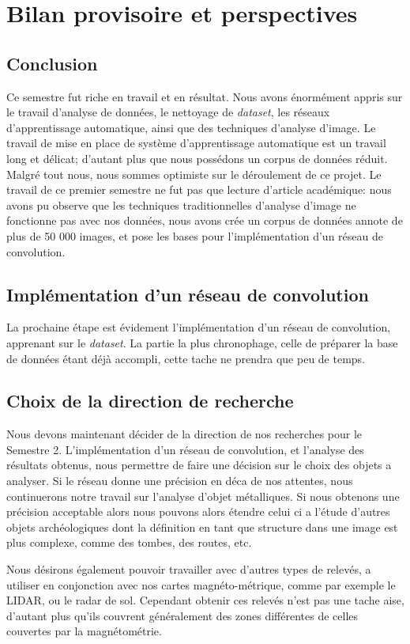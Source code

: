 \documentclass[a4paper, 12pt, titlepage, oneside, french]{article}
\begin{document}
\section{Bilan provisoire et perspectives}
	\subsection{Conclusion} %
	Ce semestre fut riche en travail et en résultat. Nous avons énormément appris sur le travail d'analyse de données, le nettoyage de \textit{dataset}, les réseaux d'apprentissage automatique, ainsi que des techniques d'analyse d'image. Le travail de mise en place de système d'apprentissage automatique est un travail long et délicat; d'autant plus que nous possédons un corpus de données réduit. Malgré tout nous, nous sommes optimiste sur le déroulement de ce projet. Le travail de ce premier semestre ne fut pas que lecture d'article académique: nous avons pu observe que les techniques traditionnelles d'analyse d'image ne fonctionne pas avec nos données, nous avons crée un corpus de données annote de plus de 50 000 images, et pose les bases pour l'implémentation d'un réseau de convolution.
	\subsection{Implémentation d'un réseau de convolution}
	La prochaine étape est évidement l'implémentation d'un réseau de convolution, apprenant sur le \textit{dataset}. La partie la plus chronophage, celle de préparer la base de données étant déjà accompli, cette tache ne prendra que peu de temps. 
	\subsection{Choix de la direction de recherche}
	Nous devons maintenant décider de la direction de nos recherches pour le Semestre 2. L'implémentation d'un réseau de convolution, et l'analyse des résultats obtenus, nous permettre de faire une décision sur le choix des objets a analyser. Si le réseau donne une précision en déca de nos attentes, nous continuerons notre travail sur l'analyse d'objet métalliques. Si nous obtenons une précision acceptable alors nous pouvons alors étendre celui ci a l'étude d'autres objets archéologiques dont la définition en tant que structure dans une image est plus complexe, comme des tombes, des routes, etc. 

	Nous désirons également pouvoir travailler avec d'autres types de relevés, a utiliser en conjonction avec nos cartes magnéto-métrique, comme par exemple le LIDAR, ou le radar de sol. Cependant obtenir ces relevés n'est pas une tache aise, d'autant plus qu'ils couvrent généralement des zones différentes de celles couvertes par la magnétométrie.
\end{document}
